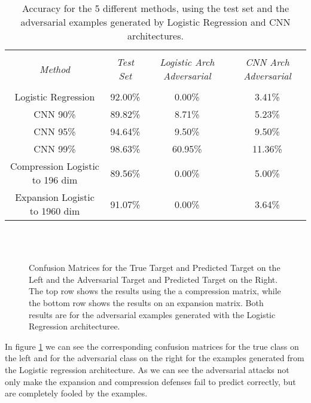 \documentclass{asaproc}
\begin{document}
\begin{table*}
	\caption{\enspace Accuracy for the 5 different methods, using the test set and the adversarial examples generated by Logistic Regression and CNN architectures.}
	\label{tab1}
	\begin{tabular*}{\hsize}{@{\extracolsep{\fill}}cccc}
		\hline
		\\[-7pt]
		\multicolumn{1}{c}{\it Method}                    & 
		\multicolumn{1}{c}{\it Test Set}                  & 
		\multicolumn{1}{c}{\it Logistic Arch Adversarial} & 
		\multicolumn{1}{c}{\it CNN Arch Adversarial}      \\
		\hline
		\\[-5pt]
		Logistic Regression      & 92.00\% & 0.00\%  & 3.41\%  \\
		CNN 90\%                 & 89.82\% & 8.71\%  & 5.23\%  \\
		CNN 95\%                 & 94.64\% & 9.50\%  & 9.50\%  \\
		CNN 99\%                 & 98.63\% & 60.95\% & 11.36\% \\
		Compression Logistic to 196 dim & 89.56\% & 0.00\%  & 5.00\%  \\
		Expansion Logistic to 1960 dim  & 91.07\% & 0.00\%  & 3.64\% 
	\end{tabular*}
\end{table*}

\begin{figure}[h!]
	\centering
	\caption{\enspace Confusion Matrices for the True Target and Predicted Target on the Left and the Adversarial Target and Predicted Target on the Right. The top row shows the results using the a compression matrix, while the bottom row shows the results on an expansion matrix. Both results are for the adversarial examples generated with the Logistic Regression architecturee.}
	   \\
	   \\
	\label{fig2}
\end{figure}

In figure \ref{fig2} we can see the corresponding confusion matrices for the true class on the left and for the adversarial class on the right for the examples generated from the Logistic regression architecture. As we can see the adversarial attacks not only make the expansion and compression defenses fail to predict correctly, but are completely fooled by the examples.
\end{document}
